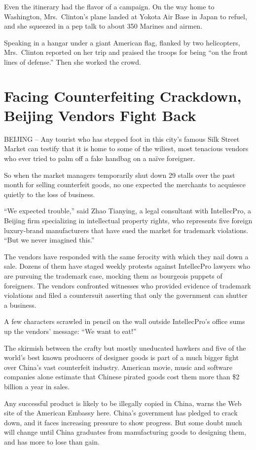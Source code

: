 \documentclass[12pt,a4paper,onecolumn]{article}
\begin{document}
\begin{CJK*}{GBK}{song}
Even the itinerary had the flavor of a campaign. On the way home to Washington, Mrs.~Clinton's plane
landed at Yokota Air Base in Japan to refuel, and she squeezed in a pep talk to about 350 Marines
and airmen.

Speaking in a hangar under a giant American flag, flanked by two helicopters, Mrs.~Clinton reported
on her trip and praised the troops for being ``on the front lines of defense.'' Then she worked the crowd.

\section{Facing Counterfeiting Crackdown, Beijing Vendors Fight Back}

BEIJING -- Any tourist who has stepped foot in this city's famous Silk Street Market can testify
that it is home to some of the wiliest, most tenacious vendors who ever tried to palm off a fake
handbag on a na\"ive foreigner.

So when the market managers temporarily shut down 29 stalls over the past month for selling
counterfeit goods, no one expected the merchants to acquiesce quietly to the loss of business.

``We expected trouble,'' said Zhao Tianying, a legal consultant with IntellecPro, a Beijing firm
specializing in intellectual property rights, who represents five foreign luxury-brand manufacturers
that have sued the market for trademark violations. ``But we never imagined this.''

The vendors have responded with the same ferocity with which they nail down a sale. Dozens of them
have staged weekly protests against IntellecPro lawyers who are pursuing the trademark case, mocking
them as bourgeois puppets of foreigners. The vendors confronted witnesses who provided evidence of
trademark violations and filed a countersuit asserting that only the government can shutter a
business.

A few characters scrawled in pencil on the wall outside IntellecPro's office sums up the vendors'
message: ``We want to eat!''

The skirmish between the crafty but mostly uneducated hawkers and five of the world's best known
producers of designer goods is part of a much bigger fight over China's vast counterfeit industry.
American movie, music and software companies alone estimate that Chinese pirated goods cost them
more than \$2 billion a year in sales.

Any successful product is likely to be illegally copied in China, warns the Web site of the American
Embassy here. China's government has pledged to crack down, and it faces increasing pressure to show
progress. But some doubt much will change until China graduates from manufacturing goods to
designing them, and has more to lose than gain.


\end{CJK*}
\end{document}
